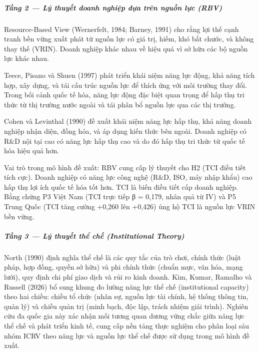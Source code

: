 \documentclass[12pt,a4paper]{article}
\begin{document}
\hypertarget{tux1ea7ng-2--luxfd-thuyux1ebft-doanh-nghiux1ec7p-dux1ef1a-truxean-nguux1ed3n-lux1ef1c-rbv}{%
\subparagraph{Tầng 2 --- Lý thuyết doanh nghiệp dựa trên nguồn lực
(RBV)}\label{tux1ea7ng-2--luxfd-thuyux1ebft-doanh-nghiux1ec7p-dux1ef1a-truxean-nguux1ed3n-lux1ef1c-rbv}}

Resource-Based View (Wernerfelt, 1984; Barney, 1991) cho rằng lợi thế
cạnh tranh bền vững xuất phát từ nguồn lực có giá trị, hiếm, khó bắt
chước, và không thay thế (VRIN). Doanh nghiệp khác nhau về hiệu quả vì
sở hữu các bộ nguồn lực khác nhau.

Teece, Pisano và Shuen (1997) phát triển khái niệm năng lực động, khả
năng tích hợp, xây dựng, và tái cấu trúc nguồn lực để thích ứng với môi
trường thay đổi. Trong bối cảnh quốc tế hóa, năng lực động đặc biệt quan
trọng để hấp thụ tri thức từ thị trường nước ngoài và tái phân bổ nguồn
lực qua các thị trường.

Cohen và Levinthal (1990) đề xuất khái niệm năng lực hấp thụ, khả năng
doanh nghiệp nhận diện, đồng hóa, và áp dụng kiến thức bên ngoài. Doanh
nghiệp có R\&D nội tại cao có năng lực hấp thụ cao và do đó hấp thụ tri
thức từ quốc tế hóa hiệu quả hơn.

Vai trò trong mô hình đề xuất: RBV cung cấp lý thuyết cho H2 (TCI điều
tiết tích cực). Doanh nghiệp có năng lực công nghệ (R\&D, ISO, máy nhập
khẩu) cao hấp thụ lợi ích quốc tế hóa tốt hơn. TCI là biến điều tiết cấp
doanh nghiệp. Bằng chứng P3 Việt Nam (TCI trực tiếp β = 0,179, nhân quả
từ IV) và P5 Trung Quốc (TCI tăng cường +0,260 lên +0,426) ủng hộ TCI là
nguồn lực VRIN bền vững.

\hypertarget{tux1ea7ng-3--luxfd-thuyux1ebft-thux1ec3-chux1ebf-institutional-theory}{%
\subparagraph{Tầng 3 --- Lý thuyết thể chế (Institutional
Theory)}\label{tux1ea7ng-3--luxfd-thuyux1ebft-thux1ec3-chux1ebf-institutional-theory}}

North (1990) định nghĩa thể chế là các quy tắc của trò chơi, chính thức
(luật pháp, hợp đồng, quyền sở hữu) và phi chính thức (chuẩn mực, văn
hóa, mạng lưới), quy định chi phí giao dịch và rủi ro kinh doanh. Kim,
Kumar, Ramalho và Russell (2026) bổ sung khung đo lường năng lực thể chế
(institutional capacity) theo hai chiều: chiều tổ chức (nhân sự, nguồn
lực tài chính, hệ thống thông tin, quản lý) và chiều quản trị (minh
bạch, độc lập, trách nhiệm giải trình). Nghiên cứu đa quốc gia này xác
nhận mối tương quan dương vững chắc giữa năng lực thể chế và phát triển
kinh tế, cung cấp nền tảng thực nghiệm cho phân loại sáu nhóm ICRV theo
năng lực và nguồn lực thể chế được sử dụng trong mô hình đề xuất.
\end{document}
